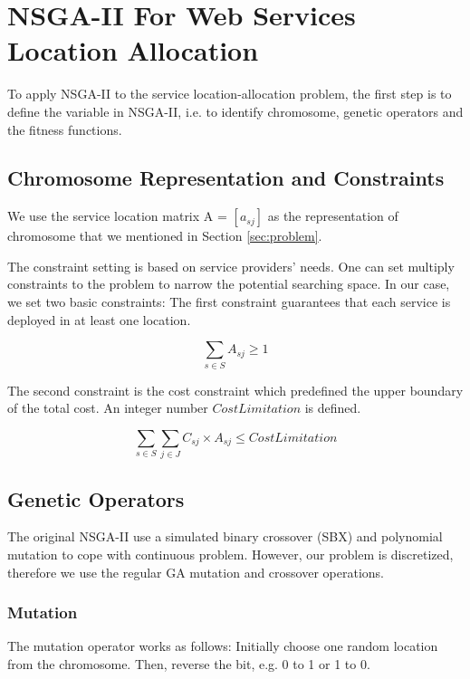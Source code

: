 \documentclass{llncs}
\begin{document}
\section{NSGA-II For Web Services Location Allocation}
\label{sec:algorithm_des}
To apply NSGA-II to the service location-allocation problem, the first step is to define the variable in NSGA-II, i.e. to
identify chromosome, genetic operators and the fitness functions.

\subsection{Chromosome Representation and Constraints}
We use the service location matrix A = $[a_{sj}]$ as the representation of chromosome that we mentioned in Section 
\ref{sec:problem}.

The constraint setting is based on service providers' needs. One can set multiply constraints to the problem to narrow the potential searching space.
In our case, we set two basic constraints: The first constraint guarantees that each service is deployed in at 
least one location.
\begin{center}
	\begin{equation}
		\sum\limits_{s \in S} A_{sj} \geq 1
	\end{equation}
\end{center}

The second constraint is the cost constraint which predefined the upper boundary of the total cost.
An integer number $CostLimitation$ is defined.
\begin{center}
	\begin{equation}
		\sum\limits_{s \in S} \sum\limits_{j \in J} C_{sj} \times A_{sj} \leq CostLimitation
	\end{equation}
\end{center}


\subsection{Genetic Operators}
\label{sec:operators}
 The original NSGA-II use a simulated 
binary crossover (SBX) \cite{930314} and polynomial mutation \cite{Raghuwanshi04} to cope with continuous problem. 
However, our problem is discretized, therefore we use the regular GA mutation and crossover operations.


\subsubsection{Mutation}
The mutation operator works as follows: Initially choose one random location from the chromosome. 
Then, reverse the bit, e.g. 0 to 1 or 1 to 0. 
\end{document}
